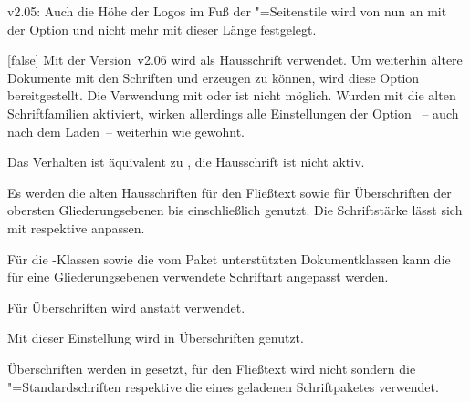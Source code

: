 \begin{Obsolete}{v2.05:}
  {}%
\printobsoletelist%
%
Auch die Höhe der Logos im Fuß der "=Seitenstile wird 
von nun an mit der Option  und nicht mehr mit dieser 
Länge festgelegt.
\end{Obsolete}


\begin{Declaration}
  [v2.06]
  {}
  [false]
\printdeclarationlist
%
Mit der Version~v2.06 wird \OpenSans als Hausschrift verwendet. Um weiterhin 
ältere Dokumente mit den Schriften \Univers und \DIN erzeugen zu können, wird 
diese Option bereitgestellt.
Die Verwendung mit  oder  ist nicht 
möglich. Wurden mit  die alten Schriftfamilien aktiviert, 
wirken allerdings alle Einstellungen der Option ~-- auch nach 
dem Laden~-- weiterhin wie gewohnt.
%
\begin{values}{}
\item[false]
  Das Verhalten ist äquivalent zu , die Hausschrift ist 
  nicht aktiv.
\item[true]
  Es werden die alten Hausschriften \Univers für den Fließtext sowie \DIN für 
  Überschriften der obersten Gliederungsebenen bis einschließlich 
   genutzt. Die Schriftstärke lässt sich mit 
   respektive  anpassen.
\end{values}
%
Für die \TUDScript-Klassen sowie die vom Paket  
unterstützten Dokumentklassen kann die für eine Gliederungsebenen verwendete 
Schriftart angepasst werden.
%
\begin{values}{}
\item[nodin]
  Für Überschriften wird \Univers anstatt \DIN verwendet.
\item[din]
  Mit dieser Einstellung wird \DIN in Überschriften genutzt. 
\item[onlydin]
  Überschriften werden in \DIN gesetzt, für den Fließtext wird nicht \Univers 
  sondern die "=Standardschriften respektive die eines geladenen 
  Schriftpaketes verwendet.
\end{values}
\end{Declaration}

